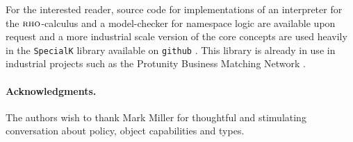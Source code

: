 \documentclass[submission,copyright,creativecommons]{eptcs}
\numberwithin{equation}{subsection}
\newcommand{\rhoc}{${\textsc{rho}}$-calculus}
\begin{document}
For the interested reader, source code for implementations of an
interpreter for the {\rhoc} and a model-checker for namespace logic
are available upon request and a more industrial scale version of the
core concepts are used heavily in the \texttt{SpecialK} library
available on \texttt{github} \cite{SpecialK}. This library is already
in use in industrial projects such as the Protunity Business Matching
Network \cite{Protunity}.

\paragraph{Acknowledgments.}
The authors wish to thank Mark Miller for thoughtful and stimulating
conversation about policy, object capabilities and types. 






\end{document}

